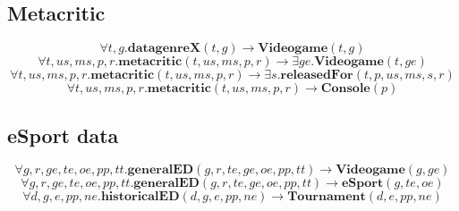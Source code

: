 \subsection*{Metacritic}
\[ \forall t,g.\textbf{datagenreX}(t,g) \rightarrow \textbf{Videogame}(t,g) \]
\[ \forall t,us,ms,p,r.\textbf{metacritic}(t,us,ms,p,r) \rightarrow \exists ge. \textbf{Videogame}(t,ge) \]
\[ \forall t,us,ms,p,r.\textbf{metacritic}(t,us,ms,p,r) \rightarrow \exists s. \textbf{releasedFor}(t,p,us,ms,s,r) \]
\[ \forall t,us,ms,p,r.\textbf{metacritic}(t,us,ms,p,r) \rightarrow \textbf{Console}(p) \]

\subsection*{eSport data}
\[ \forall g, r,ge,te,oe,pp,tt.\textbf{generalED}(g, r,te,ge,oe,pp,tt) \rightarrow \textbf{Videogame}(g,ge) \]
\[ \forall g, r,ge,te,oe,pp,tt.\textbf{generalED}(g, r,te,ge,oe,pp,tt) \rightarrow \textbf{eSport}(g,te,oe) \]
\[ \forall d,g,e,pp,ne.\textbf{historicalED}(d,g,e,pp,ne) \rightarrow \textbf{Tournament}(d,e,pp,ne) \]
